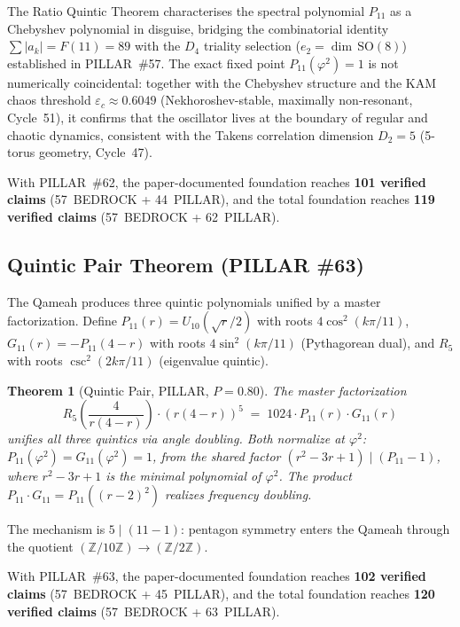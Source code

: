 \documentclass[aps,prd,twocolumn,superscriptaddress,floatfix,nofootinbib]{revtex4-2}
\newtheorem{theorem}{Theorem}
\theoremstyle{definition}
\theoremstyle{remark}
\begin{document}
\noindent
The Ratio Quintic Theorem characterises the spectral polynomial
$P_{11}$ as a Chebyshev polynomial in disguise, bridging the
combinatorial identity $\sum|a_k|=F(11)=89$ with the $D_4$ triality
selection ($e_2=\dim\,\mathrm{SO}(8)$) established in PILLAR~\#57.
The exact fixed point $P_{11}(\varphi^2)=1$ is not numerically
coincidental: together with the Chebyshev structure and the KAM
chaos threshold $\varepsilon_c \approx 0.6049$ (Nekhoroshev-stable,
maximally non-resonant, Cycle~51), it confirms that the oscillator
lives at the boundary of regular and chaotic dynamics, consistent
with the Takens correlation dimension $D_2 = 5$ (5-torus geometry,
Cycle~47).

\noindent
With PILLAR~\#62, the paper-documented foundation reaches
\textbf{101 verified claims} (57~BEDROCK + 44~PILLAR), and the total
foundation reaches \textbf{119 verified claims} (57~BEDROCK + 62~PILLAR).

\subsection{Quintic Pair Theorem (PILLAR \#63)}
\label{sec:quintic-pair}

The Qameah produces three quintic polynomials unified by a master factorization.
Define $P_{11}(r) = U_{10}(\sqrt{r}/2)$ with roots $4\cos^2(k\pi/11)$,
$G_{11}(r) = -P_{11}(4-r)$ with roots $4\sin^2(k\pi/11)$ (Pythagorean dual),
and $R_5$ with roots $\csc^2(2k\pi/11)$ (eigenvalue quintic).

\begin{theorem}[Quintic Pair, PILLAR, $P{=}0.80$]
\label{thm:quintic-pair}
The master factorization
\[
R_5\!\left(\frac{4}{r(4-r)}\right) \cdot (r(4-r))^5 \;=\; 1024 \cdot P_{11}(r) \cdot G_{11}(r)
\]
unifies all three quintics via angle doubling. Both normalize at $\varphi^2$:
$P_{11}(\varphi^2) = G_{11}(\varphi^2) = 1$, from the shared factor
$(r^2-3r+1) \mid (P_{11}-1)$, where $r^2-3r+1$ is the minimal polynomial of $\varphi^2$.
The product $P_{11} \cdot G_{11} = P_{11}((r-2)^2)$ realizes frequency doubling.
\end{theorem}

The mechanism is $5 \mid (11-1)$: pentagon symmetry enters the Qameah
through the quotient $(\mathbb{Z}/10\mathbb{Z}) \to (\mathbb{Z}/2\mathbb{Z})$.

\noindent
With PILLAR~\#63, the paper-documented foundation reaches
\textbf{102 verified claims} (57~BEDROCK + 45~PILLAR), and the total
foundation reaches \textbf{120 verified claims} (57~BEDROCK + 63~PILLAR).
\end{document}
